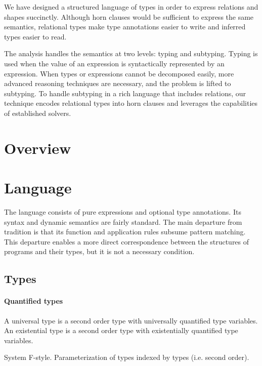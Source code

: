 \documentclass[sigplan,screen,review]{acmart}
\begin{document}
We have designed a structured language of types in order to express relations and shapes succinctly.
Although horn clauses would be sufficient to express the same semantics, relational types make type annotations easier to write
and inferred types easier to read.

The analysis handles the semantics at two levels: typing and subtyping. Typing is used when the value of an expression
is syntactically represented by an expression. When types or expressions cannot be decomposed easily, more advanced
reasoning techniques are necessary, and the problem is lifted to subtyping. To handle subtyping in a rich language that includes  
relations, our technique encodes relational types into horn clauses and leverages the capabilities of established solvers.


\section{Overview}



\section{Language}
The language consists of pure expressions and optional type annotations. 
Its syntax and dynamic semantics 
are fairly standard. The main departure from tradition is that its function
and application rules subsume pattern matching. This departure enables a more direct  
correspondence between the structures of programs and their types, but it is 
not a necessary condition.

\subsection{Types}

\paragraph{Quantified types}
A universal type is a second order type with universally quantified type variables. 
An existential type is a second order type with existentially quantified type variables. 

System F-style. Parameterization of types indexed by types (i.e. second order).

\end{document}
